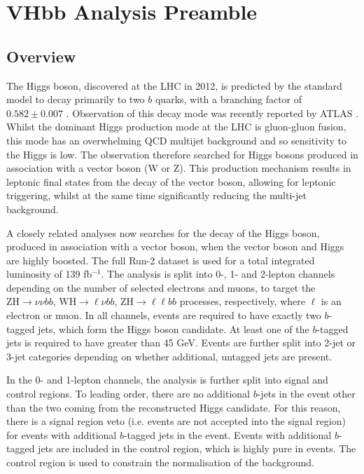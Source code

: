 \chapter{VHbb Analysis Preamble}
\label{chap:vhbbpre}

\section{Overview}

The Higgs boson, discovered at the LHC in 2012, is predicted by the standard model to decay primarily to two $b$ quarks, with a branching factor of $0.582 \pm 0.007$ \cite{2016arXiv161007922D:2016:higgs}. 
Observation of this decay mode was recently reported by ATLAS \cite{HIGG-2018-04}. Whilst the dominant Higgs production mode at the LHC is gluon-gluon fusion, this mode has an overwhelming QCD multijet background and so sensitivity to the Higgs is low. The \hbb observation therefore searched for Higgs bosons produced in association with a vector boson (W or Z). This production mechanism results in leptonic final states from the decay of the vector boson, allowing for leptonic triggering, whilst at the same time significantly reducing the multi-jet background. 

A closely related analyses now searches for the \hbb decay of the Higgs boson, produced in association with a vector boson, when the vector boson and Higgs are highly boosted. The full Run-2 dataset is used for a total integrated luminosity of 139 fb$^{-1}$. The analysis is split into 0-, 1- and 2-lepton channels depending on the number of selected electrons and muons, to target the $\text{ZH} \rightarrow \nu\nu bb$, $\text{WH} \rightarrow \ell\nu bb$, $\text{ZH} \rightarrow \ell\ell bb$ processes, respectively, where $\ell$ is an electron or muon. In all channels, events are required to have exactly two $b$-tagged jets, which form the Higgs boson candidate. At least one of the $b$-tagged jets is required to have \pT greater than 45 GeV. Events are further split into 2-jet or 3-jet categories depending on whether additional, untagged jets are present. 

In the 0- and 1-lepton channels, the analysis is further split into signal and control regions. To leading order, there are no additional $b$-jets in the event other than the two coming from the reconstructed Higgs candidate. For this reason, there is a signal region veto (i.e. events are not accepted into the signal region) for events with additional $b$-tagged jets in the event. Events with additional $b$-tagged jets are included in the control region, which is highly pure in \ttbar events. The control region is used to constrain the normalisation of the \ttbar background.
